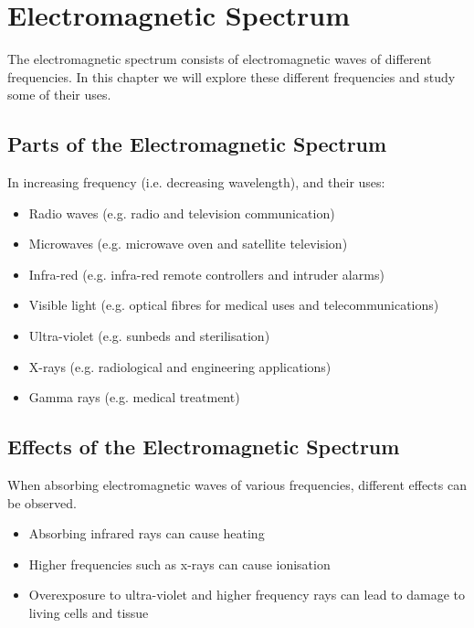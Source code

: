\documentclass[../main.tex]{subfiles}
\begin{document}
	\section{Electromagnetic Spectrum}
	\begin{preamb}
		The electromagnetic spectrum consists of electromagnetic waves of different frequencies. In this chapter we will explore these different frequencies and study some of their uses.
	\end{preamb}
	
	\subsection{Parts of the Electromagnetic Spectrum}
	In increasing frequency (i.e. decreasing wavelength), and their uses:
	\begin{itemize}
		\item Radio waves (e.g. radio and television communication)
		\item Microwaves (e.g. microwave oven and satellite television)
		\item Infra-red (e.g. infra-red remote controllers and intruder alarms)
		\item Visible light (e.g. optical fibres for medical uses and telecommunications)
		\item Ultra-violet (e.g. sunbeds and sterilisation)
		\item X-rays (e.g. radiological and engineering applications)
		\item Gamma rays (e.g. medical treatment)
	\end{itemize}
	
	\subsection{Effects of the Electromagnetic Spectrum}
	When absorbing electromagnetic waves of various frequencies, different effects can be observed.
	\begin{itemize}
		\item Absorbing infrared rays can cause heating
		\item Higher frequencies such as x-rays can cause ionisation
		\item Overexposure to ultra-violet and higher frequency rays can lead to damage to living cells and tissue
	\end{itemize}
\end{document}
